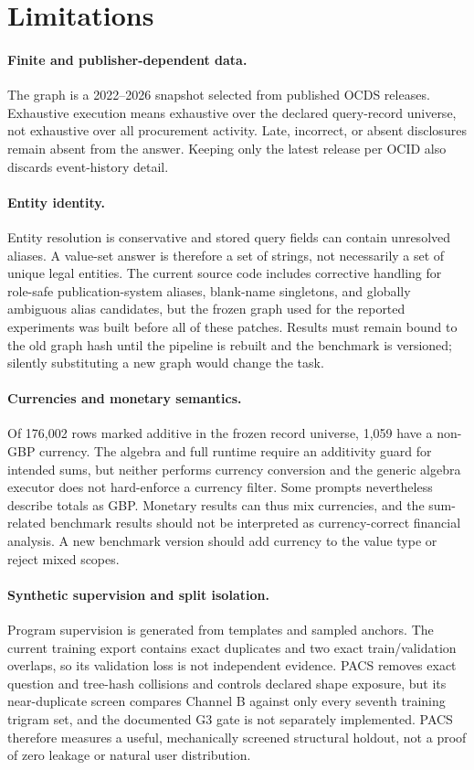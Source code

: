 \section{Limitations}
\label{sec:limitations}

\paragraph{Finite and publisher-dependent data.}
The graph is a 2022--2026 snapshot selected from published OCDS releases.  Exhaustive execution
means exhaustive over the declared query-record universe, not exhaustive over all procurement
activity.  Late, incorrect, or absent disclosures remain absent from the answer.  Keeping only
the latest release per OCID also discards event-history detail.

\paragraph{Entity identity.}
Entity resolution is conservative and stored query fields can contain unresolved aliases.  A
value-set answer is therefore a set of strings, not necessarily a set of unique legal entities.
The current source code includes corrective handling for role-safe publication-system aliases,
blank-name singletons, and globally ambiguous alias candidates, but the frozen graph used for
the reported experiments was built before all of these patches.  Results must remain bound to
the old graph hash until the pipeline is rebuilt and the benchmark is versioned; silently
substituting a new graph would change the task.

\paragraph{Currencies and monetary semantics.}
Of 176,002 rows marked additive in the frozen record universe, 1,059 have a non-GBP currency.
The algebra and full runtime require an additivity guard for intended sums, but neither performs
currency conversion and the generic algebra executor does not hard-enforce a currency filter.
Some prompts nevertheless describe totals as GBP.  Monetary results can thus mix currencies,
and the sum-related benchmark results should not be interpreted as currency-correct financial
analysis.  A new benchmark version should add currency to the value type or reject mixed scopes.

\paragraph{Synthetic supervision and split isolation.}
Program supervision is generated from templates and sampled anchors.  The current training
export contains exact duplicates and two exact train/validation overlaps, so its validation loss
is not independent evidence.  PACS removes exact question and tree-hash collisions and controls
declared shape exposure, but its near-duplicate screen compares Channel B against only every
seventh training trigram set, and the documented G3 gate is not separately implemented.  PACS
therefore measures a useful, mechanically screened structural holdout, not a proof of zero
leakage or natural user distribution.

